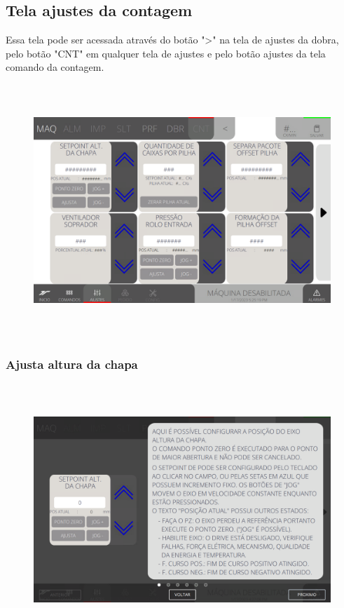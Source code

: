 \thispagestyle{fancy}
\vspace*{40 pt}
\subsection{Tela ajustes da contagem}\label{miniTelaAjustesContagem}
 Essa tela pode ser acessada através do botão "\textgreater" na tela de ajustes da dobra, pelo botão "CNT" em qualquer tela de ajustes e pelo botão ajustes da tela comando da contagem.
 \vspace*{\fill}
 \begin{figure}[h]
  \centering
  \includegraphics[width=576px,height=360px]{src/imagesFlexo/08-count/settings/e-Tela-Principal.png}
\end{figure}
\vspace*{\fill}

\newpage
\thispagestyle{fancy}
\vspace*{40 pt}
\subsubsection{\small{Ajusta altura da chapa}}\label{miniTelaAjustesContagemAjustaAlturaChapa}
\vspace*{\fill}
\begin{figure}[h]
  \centering
  \includegraphics[width=576px,height=360px]{src/imagesFlexo/08-count/settings/e-1.png}
\end{figure}
\vspace*{\fill}

